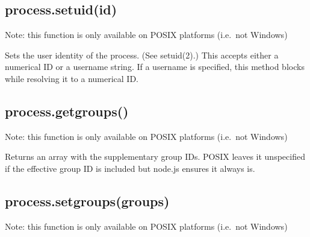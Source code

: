 \subsection{process.setuid(id)}

Note: this function is only available on POSIX platforms (i.e.~not
Windows)

Sets the user identity of the process. (See setuid(2).) This accepts
either a numerical ID or a username string. If a username is specified,
this method blocks while resolving it to a numerical ID.

\begin{Shaded}
\begin{Highlighting}[]
 \NormalTok{(} \NormalTok{&& }\NormalTok{) \{}
  \NormalTok{(} \NormalTok{+ }\NormalTok{());}
   \NormalTok{\{}
    \NormalTok{(}\NormalTok{);}
    \NormalTok{(} \NormalTok{+ }\NormalTok{());}
  \NormalTok{\}}
   
    \NormalTok{(} 
  \NormalTok{\}}
\NormalTok{\}}
\end{Highlighting}
\end{Shaded}

\subsection{process.getgroups()}

Note: this function is only available on POSIX platforms (i.e.~not
Windows)

Returns an array with the supplementary group IDs. POSIX leaves it
unspecified if the effective group ID is included but node.js ensures it
always is.

\subsection{process.setgroups(groups)}

Note: this function is only available on POSIX platforms (i.e.~not
Windows)

